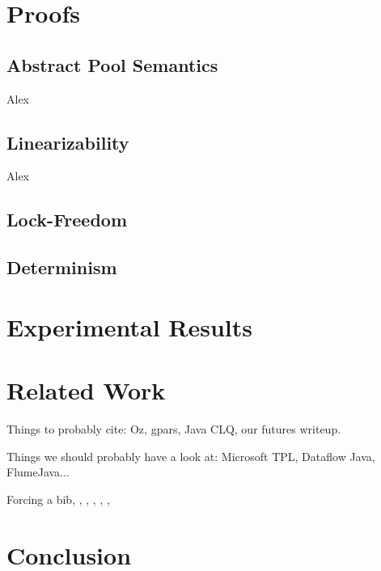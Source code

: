 \documentclass[runningheads,a4paper]{llncs}
\begin{document}
\section{Proofs}
\subsection{Abstract Pool Semantics}
Alex
\subsection{Linearizability}
Alex
\subsection{Lock-Freedom}

\subsection{Determinism}

\section{Experimental Results}

\section{Related Work}
Things to probably cite: Oz, gpars, Java CLQ, our futures writeup.

Things we should probably have a look at: Microsoft TPL, Dataflow
Java, FlumeJava...

Forcing a bib, \cite{bowman:reasoning}, \cite{braams:babel}, \cite{clark:pct}, \cite{herlihy:methodology}, \cite{Lamport:LaTeX}, \cite{salas:calculus}
\section{Conclusion}







\end{document}
